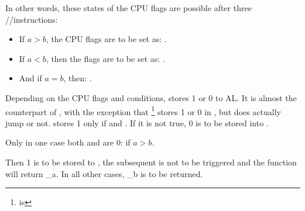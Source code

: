 In other words, these states of the CPU flags are possible
after three \FUCOMPP/\FNSTSW/\SAHF instructions:

\begin{itemize}
\item If $a>b$, the CPU flags are to be set as: .
\item If $a<b$, then the flags are to be set as: .
\item And if $a=b$, then: .
\end{itemize}


Depending on the CPU flags and conditions, \SETNBE stores 1 or 0 to AL. 
It is almost the counterpart of \JNBE, with the exception that \SETcc 
\footnote{ is } stores 1 or 0 in \AL, 
but \Jcc does actually jump or not. 
\SETNBE stores 1 only if  and . 
If it is not true, 0 is to be stored into \AL.

Only in one case both \CF and \ZF are 0: if $a>b$.

Then 1 is to be stored to \AL, the subsequent \JZ is not to be triggered and the function will return {\_a}. 
In all other cases, {\_b} is to be returned.
\fi


